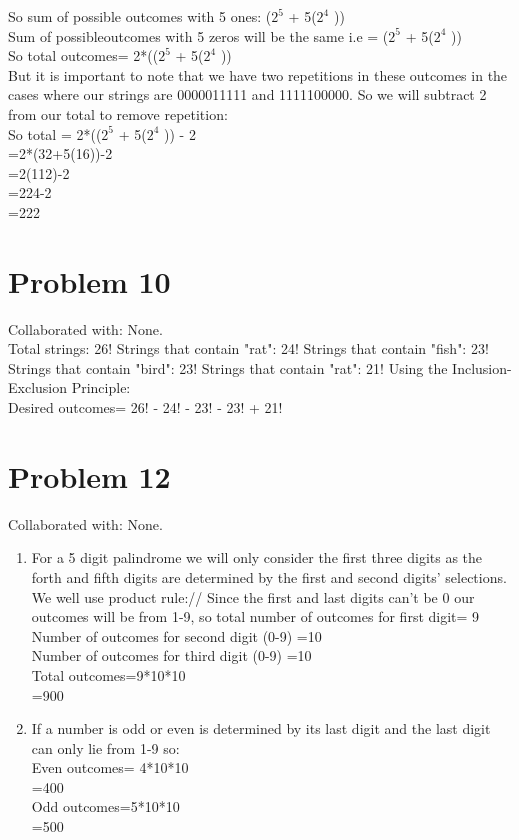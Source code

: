 \documentclass{article}
\begin{document}
So sum of possible outcomes with 5 ones: ($2^{5}$  + 5($2^{4}$ ))\\
Sum of possibleoutcomes with 5 zeros will be the same i.e = ($2^{5}$  + 5($2^{4}$ ))\\
So total outcomes= 2*(($2^{5}$  + 5($2^{4}$ ))\\
But it is important to note that we have two repetitions in these outcomes in the cases where our strings are 0000011111 and 1111100000. So we will subtract 2 from our total to remove repetition:\\
So total = 2*(($2^{5}$  + 5($2^{4}$ )) - 2 \\
=2*(32+5(16))-2\\
=2(112)-2\\
=224-2\\
=222


\section{Problem 10}
Collaborated with: None.\\
Total strings: 26!
Strings that contain "rat": 24!
Strings that contain "fish": 23!
Strings that contain "bird": 23!
Strings that contain "rat": 21!
Using the Inclusion-Exclusion Principle:\\
Desired outcomes= 26! - 24! - 23! - 23! + 21! \\

\section{Problem 12}
Collaborated with: None.\\
\begin{enumerate}
\item %
For a 5 digit palindrome we will only consider the first three digits as the forth and fifth digits are determined by the first and second digits' selections. We well use product rule://
Since the first and last digits can't be 0 our outcomes will be from 1-9, so total number of outcomes for first digit= 9\\
Number of outcomes for second digit (0-9) =10\\
Number of outcomes for third digit (0-9) =10\\
Total outcomes=9*10*10\\
=900\\
\item %
If a number is odd or even is determined by its last digit and the last digit can only lie from 1-9 so:\\
Even outcomes= 4*10*10\\
=400\\
Odd outcomes=5*10*10\\
=500\\

\end{enumerate}
\end{document}
